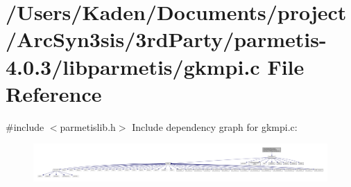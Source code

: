 \hypertarget{a00359}{}\section{/\+Users/\+Kaden/\+Documents/project/\+Arc\+Syn3sis/3rd\+Party/parmetis-\/4.0.3/libparmetis/gkmpi.c File Reference}
\label{a00359}
{\ttfamily \#include $<$parmetislib.\+h$>$}\newline
Include dependency graph for gkmpi.\+c\+:\nopagebreak
\begin{figure}[H]
\begin{center}
\leavevmode
\includegraphics[width=350pt]{a00360}
\end{center}
\end{figure}
